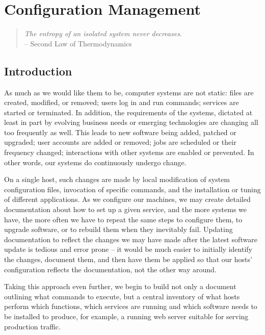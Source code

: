 \chapter{Configuration Management}
\label{chap:configuration-management}

\begin{quote}
{\em The entropy of an isolated system never decreases.} \\
-- {Second Law of Thermodynamics}
\end{quote}


\section{Introduction}
\label{configuration-management:introduction}

As much as we would like them to be, computer systems
are not static: files are created, modified, or
removed; users log in and run commands; services are
started or terminated.  In addition, the requirements
of the systems, dictated at least in part by evolving
business needs or emerging technologies are changing
all too frequently as well.  This leads to new
software being added, patched or upgraded; user
accounts are added or removed; jobs are scheduled or
their frequency changed; interactions with other
systems are enabled or prevented.  In other words, our
systems do continuously undergo change.

On a single host, such changes are made by local
modification of system configuration files, invocation
of specific commands, and the installation or tuning
of different applications.  As we configure our
machines, we may create detailed documentation about
how to set up a given service, and the more systems we
have, the more often we have to repeat the same steps
to configure them, to upgrade software, or to rebuild
them when they inevitably fail.  Updating
documentation to reflect the changes we may have made
after the latest software update is tedious and error
prone -- it would be much easier to initially identify
the changes, document them, and then have them be
applied so that our hosts' configuration reflects the
documentation, not the other way around.

Taking this approach even further, we begin to build
not only a document outlining what commands to
execute, but a central inventory of what hosts perform
which functions, which services are running and which
software needs to be installed to produce, for
example, a running web server suitable for serving
production traffic.

